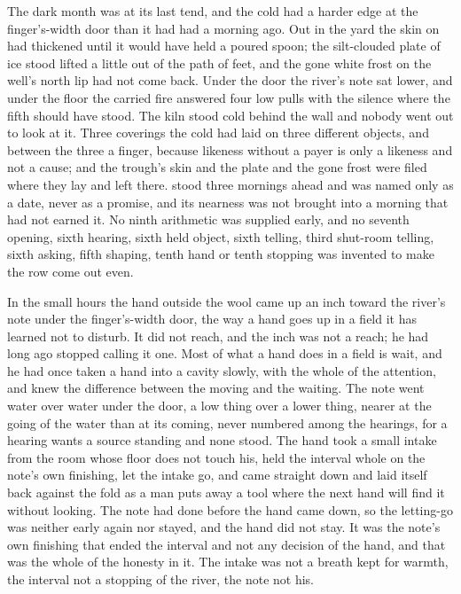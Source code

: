 \scenebreak

The dark month was at its last tend, and the cold had a harder edge at the finger's-width door than it had had a morning ago. Out in the yard the skin on  had thickened until it would have held a poured spoon; the silt-clouded plate of ice stood lifted a little out of the path of feet, and the gone white frost on the well's north lip had not come back. Under the door the river's note sat lower, and under the floor the carried fire answered four low pulls with the silence where the fifth should have stood. The kiln stood cold behind the wall and nobody went out to look at it. Three coverings the cold had laid on three different objects, and between the three a finger, because likeness without a payer is only a likeness and not a cause; and the trough's skin and the plate and the gone frost were filed where they lay and left there.  stood three mornings ahead and was named only as a date, never as a promise, and its nearness was not brought into a morning that had not earned it. No ninth arithmetic was supplied early, and no seventh opening, sixth hearing, sixth held object, sixth telling, third shut-room telling, sixth asking, fifth shaping, tenth hand or tenth stopping was invented to make the row come out even.

\scenebreak

In the small hours the hand outside the wool came up an inch toward the river's note under the finger's-width door, the way a hand goes up in a field it has learned not to disturb. It did not reach, and the inch was not a reach; he had long ago stopped calling it one. Most of what a hand does in a field is wait, and he had once taken a hand into a cavity slowly, with the whole of the attention, and knew the difference between the moving and the waiting. The note went water over water under the door, a low thing over a lower thing, nearer at the going of the water than at its coming, never numbered among the hearings, for a hearing wants a source standing and none stood. The hand took a small intake from the room whose floor does not touch his, held the interval whole on the note's own finishing, let the intake go, and came straight down and laid itself back against the fold as a man puts away a tool where the next hand will find it without looking. The note had done before the hand came down, so the letting-go was neither early again nor stayed, and the hand did not stay. It was the note's own finishing that ended the interval and not any decision of the hand, and that was the whole of the honesty in it. The intake was not a breath kept for warmth, the interval not a stopping of the river, the note not his.

